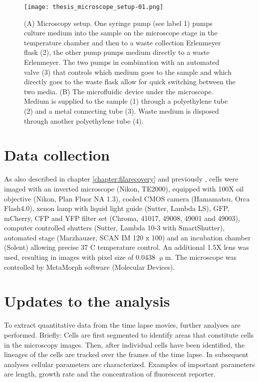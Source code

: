 \begin{figure}
	\centering
	\texttt{[image: thesis\_microscope\_setup-01.png]}
	\caption{ 
	(A) Microscopy setup. One syringe pump (see label 1) pumps culture medium into the sample on the microscope stage in the temperature chamber and then to a waste collection Erlenmeyer flask (2), the other pump pumps medium directly to a waste Erlenmeyer. The two pumps in combination with an automated valve (3) that controls which medium goes to the sample and which directly goes to the waste flask allow for quick switching between the two media.
	(B) The microfluidic device under the microscope. 
	Medium is supplied to the sample (1) through a polyethylene tube (2) and a metal connecting tube (3). Waste medium is disposed through another polyethylene tube (4).
	}
	\label{fig:mm:microscope_setup}
\end{figure}

\section{Data collection}
As also described in chapter \ref{chapter:filarecovery} and previously \cite{Boulineau2013, Kiviet2014}, 
cells were imaged with an inverted microscope (Nikon, TE2000), equipped with 100X oil objective (Nikon, Plan Fluor NA 1.3), 
cooled CMOS camera (Hamamatsu, Orca Flash4.0), xenon lamp with liquid light guide (Sutter, Lambda LS), GFP, mCherry, CFP and YFP filter set (Chroma, 41017, 49008, 49001 and 49003), 
computer controlled shutters (Sutter, Lambda 10-3 with SmartShutter), automated stage (Marzhauzer, SCAN IM 120 x 100) and an incubation chamber (Solent) allowing precise 37 C temperature control. 
An additional 1.5X lens was used, resulting in images with pixel size of 0.0438 $\upmu$m. The microscope was controlled by MetaMorph software (Molecular Devices). 

\section{Updates to the analysis}

To extract quantitative data from the time lapse movies, further analyses are performed.
Briefly: Cells are first segmented to identify areas that constitute cells in the microscopy images. Then, after individual cells have been identified, the lineages of the cells are tracked over the frames of the time lapse. In subsequent analyses cellular parameters are characterized. Examples of important parameters are length, growth rate and the concentration of fluorescent reporter.


